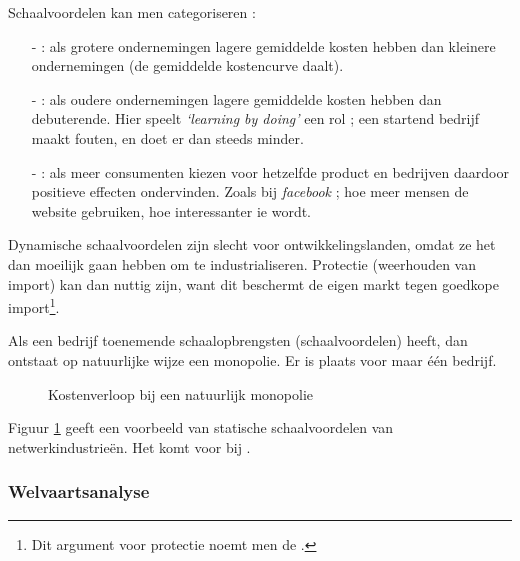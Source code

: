 \par Schaalvoordelen kan men categoriseren :
\begin{itemize}
\item[-]  : als grotere ondernemingen lagere gemiddelde kosten hebben dan kleinere ondernemingen (de gemiddelde kostencurve daalt).
\item[-]  : als oudere ondernemingen lagere gemiddelde kosten hebben dan debuterende. Hier speelt \textit{`learning by doing'} een rol ; een startend bedrijf maakt fouten, en doet er dan steeds minder.
\item[-]  : als meer consumenten kiezen voor hetzelfde product en bedrijven daardoor positieve effecten ondervinden. Zoals bij \textit{facebook} ; hoe meer mensen de website gebruiken, hoe interessanter ie wordt.
\end{itemize}
Dynamische schaalvoordelen zijn slecht voor ontwikkelingslanden, omdat ze het dan moeilijk gaan hebben om te industrialiseren. Protectie (weerhouden van import) kan dan nuttig zijn, want dit beschermt de eigen markt tegen goedkope import\footnote{Dit argument voor protectie noemt men de .}.\\

\par Als een bedrijf toenemende schaalopbrengsten (schaalvoordelen) heeft, dan ontstaat op natuurlijke wijze een monopolie. Er is plaats voor maar \'e\'en bedrijf.

\begin{figure}[H]
\vspace{0.5cm}
\centering
\captionsetup{justification=centering,margin=2cm}
\caption{Kostenverloop bij een natuurlijk monopolie}
\label{fig:h3natmon}
\end{figure}

Figuur \ref{fig:h3natmon} geeft een voorbeeld van statische schaalvoordelen van netwerkindustrie\"en. Het komt voor bij .

\subsubsection{Welvaartsanalyse}

